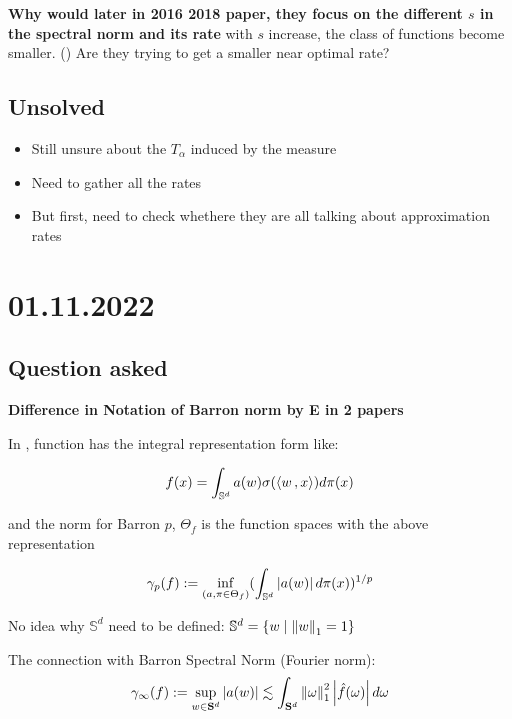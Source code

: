 \textbf{Why would later in 2016 2018 paper, they focus on the different $s$ in the spectral norm and its rate}
with $s$ increase, the class of functions become smaller. () 
Are they trying to get a smaller near optimal rate?

\subsection{Unsolved}

\begin{itemize}
    \item Still unsure about the $T_{\alpha}$ induced by the measure
    \item Need to gather all the rates
    \item But first, need to check whethere they are all talking about approximation rates
\end{itemize}


\section{01.11.2022}

\subsection{Question asked}

\textbf{Difference in Notation of Barron norm by E in 2 papers}

In \cite{ePrioriEstimatesPopulation2019}, function has the integral representation form like:

\begin{equation*}
    f(x) = \int_{\mathbb{S}^d} a(w) \sigma(\left\langle w\, , x \right\rangle) d\pi(x)
\end{equation*}

and the norm for Barron $p$, $\Theta_f$ is the function spaces with the above representation

\begin{equation*}
    \gamma_p(f) := \inf_{(a, \pi \in \Theta_f)} (\int_{\mathbb{S}^d} \left| a(w) \right| d\pi(x))^{1/p}
\end{equation*}

No idea why $\mathbb{S}^d$ need to be defined: $\mathbb{S}^d = \{w \mid \left\| w \right\|_1 = 1\}$

The connection with Barron Spectral Norm (Fourier norm):
\begin{equation*}
    \gamma_{\infty}(f) := \sup_{w\in \mathbf{S}^d} \left| a(w) \right| \lesssim \int_{\mathbf{S}^d} \left\| \omega \right\|_1^2 \left| \hat{f}(\omega) \right| d\omega
\end{equation*}

